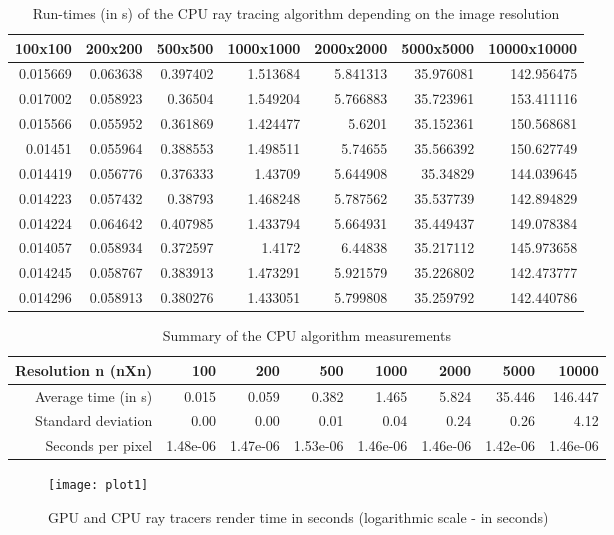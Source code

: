 \begin{table}[ht]
\centering
\caption{Run-times (in s) of the CPU ray tracing algorithm depending on the image resolution}
\begin{tabular}{|r|r|r|r|r|r|r|}
100x100 & 200x200 & 500x500 & 1000x1000 & 2000x2000 & 5000x5000 & 10000x10000 \\
\hline
0.015669 & 0.063638 & 0.397402 & 1.513684 & 5.841313 & 35.976081 & 142.956475 \\
0.017002 & 0.058923 & 0.36504 & 1.549204 & 5.766883 & 35.723961 & 153.411116 \\
0.015566 & 0.055952 & 0.361869 & 1.424477 & 5.6201 & 35.152361 & 150.568681 \\
0.01451 & 0.055964 & 0.388553 & 1.498511 & 5.74655 & 35.566392 & 150.627749 \\
0.014419 & 0.056776 & 0.376333 & 1.43709 & 5.644908 & 35.34829 & 144.039645 \\
0.014223 & 0.057432 & 0.38793 & 1.468248 & 5.787562 & 35.537739 & 142.894829 \\
0.014224 & 0.064642 & 0.407985 & 1.433794 & 5.664931 & 35.449437 & 149.078384 \\
0.014057 & 0.058934 & 0.372597 & 1.4172 & 6.44838 & 35.217112 & 145.973658 \\
0.014245 & 0.058767 & 0.383913 & 1.473291 & 5.921579 & 35.226802 & 142.473777 \\
0.014296 & 0.058913 & 0.380276 & 1.433051 & 5.799808 & 35.259792 & 142.440786 \\
\end{tabular}
\end{table}

\begin{table}[ht]
\centering
\caption{Summary of the CPU algorithm measurements}
\begin{tabular}{|r|r|r|r|r|r|r|r|}
Resolution n (nXn)& 100 & 200 & 500 & 1000 & 2000 & 5000 & 10000 \\
\hline
Average time (in s) & 0.015 & 0.059 & 0.382 & 1.465 & 5.824 & 35.446 & 146.447 \\
Standard deviation & 0.00 & 0.00 & 0.01 & 0.04 & 0.24 & 0.26 & 4.12 \\
Seconds per pixel & 1.48e-06 & 1.47e-06 & 1.53e-06 & 1.46e-06 & 1.46e-06 & 1.42e-06 & 1.46e-06 \\
\end{tabular}
\end{table}

\begin{figure}[ht] %
\texttt{[image: plot1]}
\centering
\caption{GPU and CPU ray tracers render time in seconds (logarithmic scale - in seconds)}
\end{figure}

